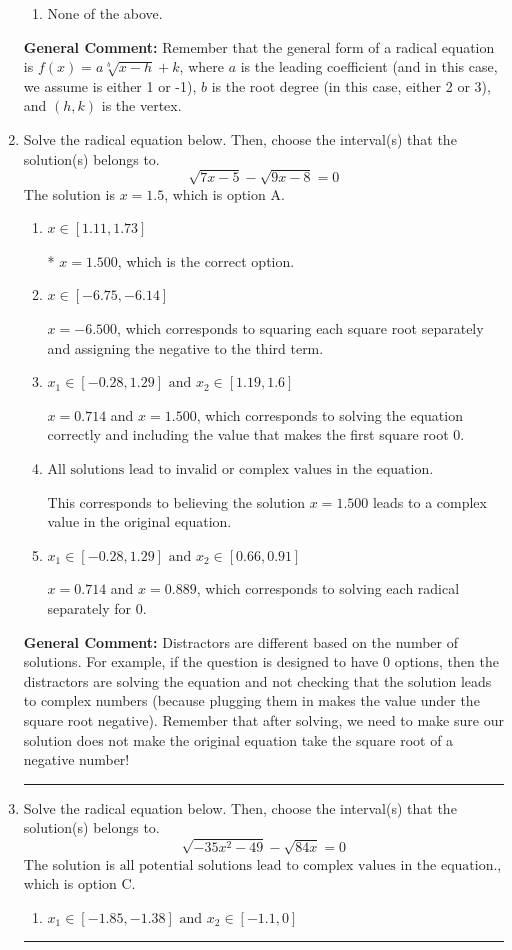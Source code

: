 \documentclass{extbook}[14pt]
\newcommand{\litem}[1]{\item #1

\rule{\textwidth}{0.4pt}}
\begin{document}
\begin{enumerate}
{\begin{enumerate}[label=\Alph*.]
\begin{multicols}{2}
\end{multicols}\item None of the above.\end{enumerate}
\textbf{General Comment:} Remember that the general form of a radical equation is $ f(x) = a \sqrt[b]{x - h} + k $, where $a$ is the leading coefficient (and in this case, we assume is either 1 or -1), $b$ is the root degree (in this case, either 2 or 3), and $(h, k)$ is the vertex.
}
\litem{
Solve the radical equation below. Then, choose the interval(s) that the solution(s) belongs to.
\[ \sqrt{7 x - 5} - \sqrt{9 x - 8} = 0 \]The solution is \( x = 1.5 \), which is option A.\begin{enumerate}[label=\Alph*.]
\item \( x \in [1.11,1.73] \)

* $x = 1.500$, which is the correct option.
\item \( x \in [-6.75,-6.14] \)

$x = -6.500$, which corresponds to squaring each square root separately and assigning the negative to the third term.
\item \( x_1 \in [-0.28, 1.29] \text{ and } x_2 \in [1.19,1.6] \)

$x = 0.714$ and $x = 1.500$, which corresponds to solving the equation correctly and including the value that makes the first square root 0.
\item \( \text{All solutions lead to invalid or complex values in the equation.} \)

This corresponds to believing the solution $x = 1.500$ leads to a complex value in the original equation.
\item \( x_1 \in [-0.28, 1.29] \text{ and } x_2 \in [0.66,0.91] \)

$x = 0.714$ and $x = 0.889$, which corresponds to solving each radical separately for 0.
\end{enumerate}

\textbf{General Comment:} Distractors are different based on the number of solutions. For example, if the question is designed to have 0 options, then the distractors are solving the equation and not checking that the solution leads to complex numbers (because plugging them in makes the value under the square root negative). Remember that after solving, we need to make sure our solution does not make the original equation take the square root of a negative number!
}
\litem{
Solve the radical equation below. Then, choose the interval(s) that the solution(s) belongs to.
\[ \sqrt{-35 x^2 - 49} - \sqrt{84 x} = 0 \]The solution is \( \text{all potential solutions lead to complex values in the equation.} \), which is option C.\begin{enumerate}[label=\Alph*.]
\item \( x_1 \in [-1.85, -1.38] \text{ and } x_2 \in [-1.1,0] \)


\end{enumerate}}
\end{enumerate}
\end{document}
